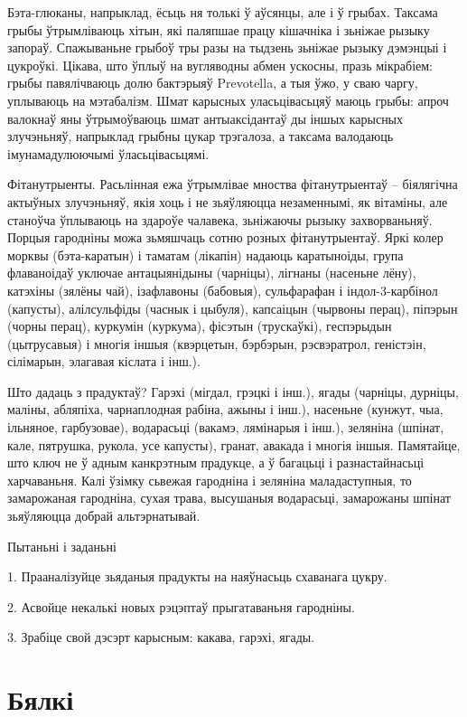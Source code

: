 Бэта-глюканы, напрыклад, ёсьць ня толькі ў аўсянцы, але і ў грыбах. Таксама грыбы ўтрымліваюць хітын, які паляпшае працу кішачніка і зьніжае рызыку запораў. Спажываньне грыбоў тры разы на тыдзень зьніжае рызыку дэмэнцыі і цукроўкі. Цікава, што ўплыў на вугляводны абмен ускосны, празь мікрабіем: грыбы павялічваюць долю бактэрыяў Prevotella, а тыя ўжо, у сваю чаргу, уплываюць на мэтабалізм. Шмат карысных уласьцівасьцяў маюць грыбы: апроч валокнаў яны ўтрымоўваюць шмат антыаксідантаў ды іншых карысных злучэньняў, напрыклад грыбны цукар трэгалоза, а таксама валодаюць імунамадулюючымі ўласьцівасьцямі.

Фітанутрыенты. Расьлінная ежа ўтрымлівае мноства фітанутрыентаў – біялягічна актыўных злучэньняў, якія хоць і не зьяўляюцца незаменнымі, як вітаміны, але станоўча ўплываюць на здароўе чалавека, зьніжаючы рызыку захворваньняў. Порцыя гародніны можа зьмяшчаць сотню розных фітанутрыентаў. Яркі колер морквы (бэта-каратын) і таматам (лікапін) надаюць каратыноіды, група флаваноідаў уключае антацыянідыны (чарніцы), лігнаны (насеньне лёну), катэхіны (зялёны чай), ізафлавоны (бабовыя), сульфарафан і індол-3-карбінол (капусты), алілсульфіды (часнык і цыбуля), капсаіцын (чырвоны перац), піпэрын (чорны перац), куркумін (куркума), фісэтын (трускаўкі), геспэрыдын (цытрусавыя) і многія іншыя (квэрцетын, бэрбэрын, рэсвэратрол, геністэін, сілімарын, элагавая кіслата і інш.).

Што дадаць з прадуктаў? Гарэхі (мігдал, грэцкі і інш.), ягады (чарніцы, дурніцы, маліны, абляпіха, чарнаплодная рабіна, ажыны і інш.), насеньне (кунжут, чыа, ільняное, гарбузовае), водарасьці (вакамэ, лямінарыя і інш.), зеляніна (шпінат, кале, пятрушка, рукола, усе капусты), гранат, авакада і многія іншыя. Памятайце, што ключ не ў адным канкрэтным прадукце, а ў багацьці і разнастайнасьці харчаваньня. Калі ўзімку сьвежая гародніна і зеляніна маладаступныя, то замарожаная гародніна, сухая трава, высушаныя водарасьці, замарожаны шпінат зьяўляюцца добрай альтэрнатывай.

Пытаньні і заданьні

1. Прааналізуйце зьяданыя прадукты на наяўнасьць схаванага цукру.

2. Асвойце некалькі новых рэцэптаў прыгатаваньня гародніны.

3. Зрабіце свой дэсэрт карысным: какава, гарэхі, ягады.


\section{Бялкі}

